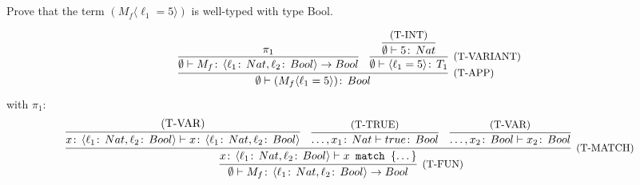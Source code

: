 \subsection{}

Prove that the term \((M_f \langle\ell_1=5\rangle)\) is well-typed
with type Bool.

\[
\infer[\text{\small{(T-APP)}}]
      {\emptyset \vdash (M_f \langle\ell_1=5\rangle) \TBOOL}
      {\infer{\emptyset \vdash M_f \TYPE{\VAR{\ell_1 \TNAT, \ell_2 \TBOOL} \to Bool}}{\pi_1}
       &
       \infer[\text{\small{(T-VARIANT)}}]
        {\emptyset \vdash \VAR{\ell_1 = 5} \TYPE{T_1}}
        {\infer{\emptyset \vdash 5 \TNAT}{\text{\small{(T-INT)}}}}}
\]
with \(\pi_1\):
\[
\infer[\text{\small{(T-FUN)}}]
        {\emptyset \vdash M_f \TYPE{\VAR{\ell_1 \TNAT, \ell_2 \TBOOL} \to Bool}}
        {\infer[\text{\small{(T-MATCH)}}]
          {x \TYPE{\VAR{\ell_1 \TNAT, \ell_2 \TBOOL}} \vdash \MATCH{x}{\dots}}
          {
            \infer{x \TYPE{\VAR{\ell_1 \TNAT, \ell_2 \TBOOL}} \vdash x \TYPE{\VAR{\ell_1 \TNAT, \ell_2 \TBOOL}}}{\text{(T-VAR)}}
            &
            \infer{\dots, x_1 \TNAT \vdash true \TBOOL}{\text{\small{(T-TRUE)}}}
            &
            \infer{\dots, x_2 \TBOOL \vdash x_2 \TBOOL}{\text{\small{(T-VAR)}}}}}
\]
